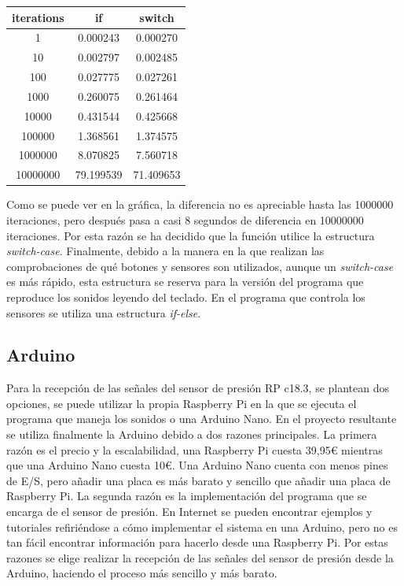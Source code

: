 \documentclass{article}
\begin{document}
    \begin{center}
        \begin{tabular}{ |c|c|c| }
            \hline
                iterations & if & switch \\
                \hline\hline
                1 & 0.000243 & 0.000270 \\
                \hline
                10 & 0.002797 & 0.002485 \\
                \hline
                100 & 0.027775 & 0.027261 \\
                \hline
                1000 & 0.260075 & 0.261464 \\
                \hline
                10000 & 0.431544 & 0.425668 \\
                \hline
                100000 & 1.368561 & 1.374575 \\
                \hline
                1000000 & 8.070825 & 7.560718 \\
                \hline
                10000000 & 79.199539 & 71.409653 \\
            \hline
        \end{tabular}
    \end{center}
    Como se puede ver en la gráfica, la diferencia no es apreciable hasta las 1000000 iteraciones, pero después
    pasa a casi 8 segundos de diferencia en 10000000 iteraciones. Por esta razón se ha decidido que la función
    utilice la estructura \textit{switch-case}.\newline
    Finalmente, debido a la manera en la que realizan las comprobaciones de qué botones y sensores son utilizados,
    aunque un \textit{switch-case} es más rápido, esta estructura se reserva para la versión del programa que
    reproduce los sonidos leyendo del teclado. En el programa que controla los sensores se utiliza una estructura
    \textit{if-else}.

    \subsection{Arduino}
    Para la recepción de las señales del sensor de presión RP c18.3, se plantean dos opciones, se puede utilizar
    la propia Raspberry Pi en la que se ejecuta el programa que maneja los sonidos o una Arduino Nano. En el
    proyecto resultante se utiliza finalmente la Arduino debido a dos razones principales.\newline
    La primera razón es el precio y la escalabilidad, una Raspberry Pi cuesta 39,95\euro{} mientras que una
    Arduino Nano cuesta 10\euro{}. Una Arduino Nano cuenta con menos pines de E/S, pero añadir una placa es más
    barato y sencillo que añadir una placa de Raspberry Pi.\newline
    La segunda razón es la implementación del programa que se encarga de el sensor de presión. En Internet se
    pueden encontrar ejemplos y tutoriales refiriéndose a cómo implementar el sistema en una Arduino, pero no
    es tan fácil encontrar información para hacerlo desde una Raspberry Pi.\newline
    Por estas razones se elige realizar la recepción de las señales del sensor de presión desde la Arduino,
    haciendo el proceso más sencillo y más barato.
\end{document}
